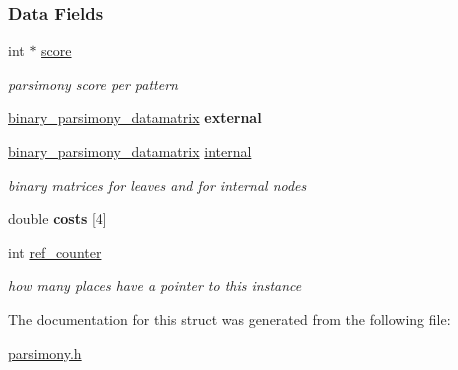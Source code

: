 \subsubsection*{Data Fields}
\begin{DoxyCompactItemize}
\item 
\mbox{\label{structbinary__parsimony__struct_a8002f973d4c738ceb44ff459833965b2}} 
int $\ast$ \hyperlink{structbinary__parsimony__struct_a8002f973d4c738ceb44ff459833965b2}{score}
\begin{DoxyCompactList}\small\item\em parsimony score per pattern \end{DoxyCompactList}\item 
\mbox{\label{structbinary__parsimony__struct_a7ee8780b9cbca6b4b5a6415ef0a47377}} 
\hyperlink{structbinary__parsimony__datamatrix__struct}{binary\+\_\+parsimony\+\_\+datamatrix} {\bfseries external}
\item 
\mbox{\label{structbinary__parsimony__struct_a27c3b203843a26338af931010c7666de}} 
\hyperlink{structbinary__parsimony__datamatrix__struct}{binary\+\_\+parsimony\+\_\+datamatrix} \hyperlink{structbinary__parsimony__struct_a27c3b203843a26338af931010c7666de}{internal}
\begin{DoxyCompactList}\small\item\em binary matrices for leaves and for internal nodes \end{DoxyCompactList}\item 
\mbox{\label{structbinary__parsimony__struct_a6515933c8e71aba6cb2795d9ecfd78b8}} 
double {\bfseries costs} \mbox{[}4\mbox{]}
\item 
\mbox{\label{structbinary__parsimony__struct_a5aab1b8c99ac264cba1c17612f72edea}} 
int \hyperlink{structbinary__parsimony__struct_a5aab1b8c99ac264cba1c17612f72edea}{ref\+\_\+counter}
\begin{DoxyCompactList}\small\item\em how many places have a pointer to this instance \end{DoxyCompactList}\end{DoxyCompactItemize}


The documentation for this struct was generated from the following file\+:\begin{DoxyCompactItemize}
\item 
\hyperlink{parsimony_8h}{parsimony.\+h}\end{DoxyCompactItemize}
